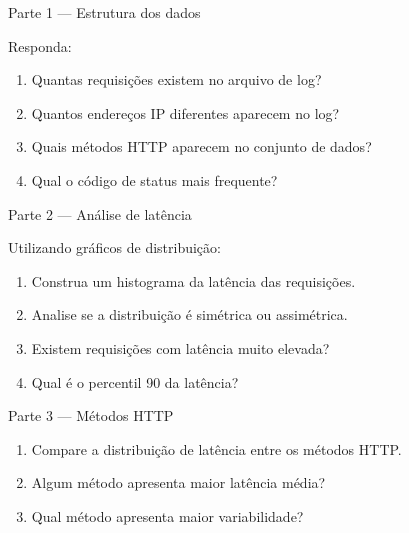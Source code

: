 \documentclass[12pt,a4paper,twoside]{report}
\begin{document}
\begin{block}{Parte 1 — Estrutura dos dados}

Responda:

\begin{enumerate}
\item Quantas requisições existem no arquivo de log?
\item Quantos endereços IP diferentes aparecem no log?
\item Quais métodos HTTP aparecem no conjunto de dados?
\item Qual o código de status mais frequente?
\end{enumerate}

\vspace{2cm}

\end{block}

\begin{block}{Parte 2 — Análise de latência}

Utilizando gráficos de distribuição:

\begin{enumerate}
\item Construa um histograma da latência das requisições.
\item Analise se a distribuição é simétrica ou assimétrica.
\item Existem requisições com latência muito elevada?
\item Qual é o percentil 90 da latência?
\end{enumerate}

\vspace{3cm}

\end{block}

\begin{block}{Parte 3 — Métodos HTTP}

\begin{enumerate}
\item Compare a distribuição de latência entre os métodos HTTP.
\item Algum método apresenta maior latência média?
\item Qual método apresenta maior variabilidade?
\end{enumerate}

\vspace{3cm}

\end{block}
\end{document}
